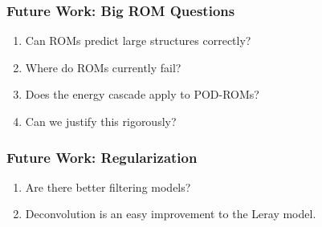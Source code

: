 \documentclass[mathserif]{beamer}
\begin{document}
    \begin{frame}
        \frametitle{Future Work: Big ROM Questions}
        \begin{enumerate}
            \item Can ROMs predict large structures correctly?
            \item Where do ROMs currently fail?
            \item Does the energy cascade apply to POD-ROMs?
            \item Can we justify this rigorously?
        \end{enumerate}
    \end{frame}

    \begin{frame}
        \frametitle{Future Work: Regularization}
        \begin{enumerate}
            \item Are there better filtering models?
            \pause
            \item Deconvolution is an easy improvement to the Leray model.
        \end{enumerate}
    \end{frame}

    \begin{frame}
        
        \tiny
        {
        
        }
    \end{frame}
\end{document}
